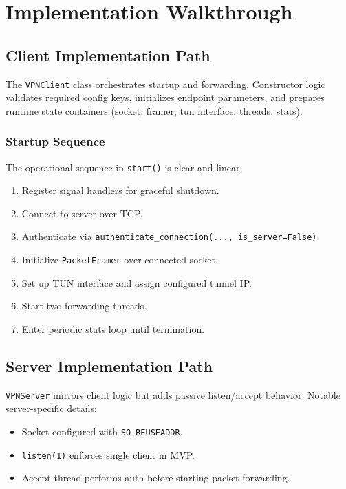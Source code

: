 \chapter{Implementation Walkthrough}

\section{Client Implementation Path}
The \texttt{VPNClient} class orchestrates startup and forwarding. Constructor logic validates required config keys, initializes endpoint parameters, and prepares runtime state containers (socket, framer, tun interface, threads, stats).

\subsection{Startup Sequence}
The operational sequence in \texttt{start()} is clear and linear:
\begin{enumerate}[leftmargin=2em]
\item Register signal handlers for graceful shutdown.
\item Connect to server over TCP.
\item Authenticate via \texttt{authenticate\_connection(..., is\_server=False)}.
\item Initialize \texttt{PacketFramer} over connected socket.
\item Set up TUN interface and assign configured tunnel IP.
\item Start two forwarding threads.
\item Enter periodic stats loop until termination.
\end{enumerate}

\section{Server Implementation Path}
\texttt{VPNServer} mirrors client logic but adds passive listen/accept behavior. Notable server-specific details:
\begin{itemize}[leftmargin=2em]
\item Socket configured with \texttt{SO\_REUSEADDR}.
\item \texttt{listen(1)} enforces single client in MVP.
\item Accept thread performs auth before starting packet forwarding.
\end{itemize}

